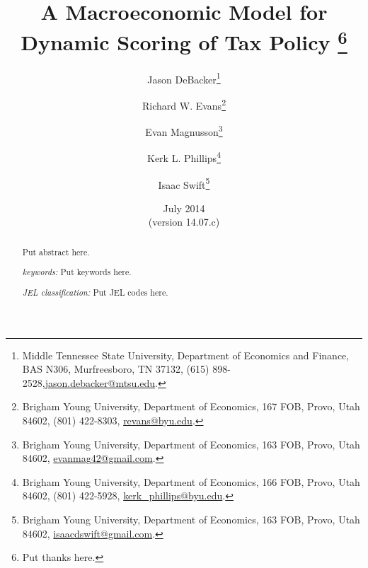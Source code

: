\documentclass[letterpaper,12pt]{article}
\theoremstyle{definition}
\begin{document}
\begin{titlepage}
\title{A Macroeconomic Model for \\
       Dynamic Scoring of Tax Policy
       \thanks{
       Put thanks here.}
       }
\author{
  Jason DeBacker\footnote{Middle Tennessee State University, Department of Economics and Finance, BAS N306, Murfreesboro, TN 37132, (615) 898-2528,\href{mailto:jason.debacker@mtsu.edu}{jason.debacker@mtsu.edu}.} \\[-2pt]
  \and
  Richard W. Evans\footnote{Brigham Young University, Department of Economics, 167 FOB, Provo, Utah 84602, (801) 422-8303, \href{mailto:revans@byu.edu}{revans@byu.edu}.} \\[-2pt]
  \and
  Evan Magnusson\footnote{Brigham Young University, Department of Economics, 163 FOB, Provo, Utah 84602, \href{mailto:evanmag42@gmail.com}{evanmag42@gmail.com}.} \\[-2pt]
  \and
  Kerk L. Phillips\footnote{Brigham Young University, Department of Economics, 166 FOB, Provo, Utah 84602, (801) 422-5928, \href{mailto:kerk_phillips@byu.edu}{kerk\_phillips@byu.edu}.} \\[-2pt]
  \and
  Isaac Swift\footnote{Brigham Young University, Department of Economics, 163 FOB, Provo, Utah 84602, \href{mailto:isaacdswift@gmail.com}{isaacdswift@gmail.com}.} \\[-2pt]}
\date{July 2014 \\
  \scriptsize{(version 14.07.c)}}
\maketitle
\begin{abstract}
\normalsize{Put abstract here.

\vspace{3mm}

\noindent\textit{keywords:}\: Put keywords here.

\vspace{3mm}

\noindent\textit{JEL classification:} Put JEL codes here.}
\end{abstract}
\thispagestyle{empty}
\end{titlepage}
\end{document}
